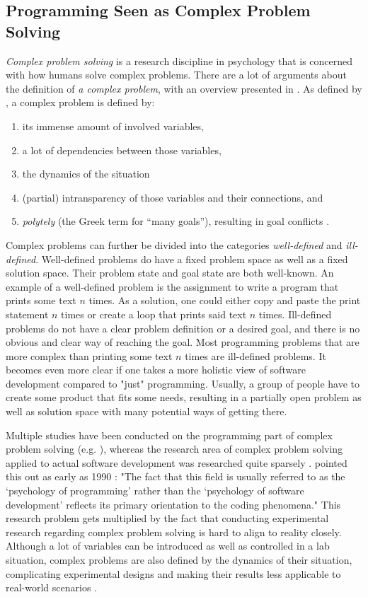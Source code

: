 \subsection{Programming Seen as Complex Problem Solving}
\emph{Complex problem solving} is a research discipline in psychology that is concerned with how humans solve complex problems.
There are a lot of arguments about the definition of \emph{a complex problem}, with an overview presented in \cite{dorner_complex_2017}.
As defined by \citeauthor{funke_complex_2012}, a complex problem is defined by:
%
\begin{enumerate}
\item its immense amount of involved variables,
\item a lot of dependencies between those variables,
\item the dynamics of the situation
\item (partial) intransparency of those variables and their connections, and
\item \emph{polytely} (the Greek term for “many goals”), resulting in goal conflicts \cite{funke_complex_2012}.
\end{enumerate}
%
Complex problems can further be divided into the categories \emph{well-defined} and \emph{ill-defined}.
Well-defined problems do have a fixed problem space as well as a fixed solution space.
Their problem state and goal state are both well-known.
An example of a well-defined problem is the assignment to write a program that prints some text $n$ times.
As a solution, one could either copy and paste the print statement $n$ times or create a loop that prints said text $n$ times.
Ill-defined problems do not have a clear problem definition or a desired goal, and there is no obvious and clear way of reaching the goal.
Most programming problems that are more complex than printing some text $n$ times are ill-defined problems.
It becomes even more clear if one takes a more holistic view of software development compared to "just" programming.
Usually, a group of people have to create some product that fits some needs, resulting in a partially open problem as well as solution space with many potential ways of getting there.

Multiple studies have been conducted on the programming part of complex problem solving (e.g. \cite{lawan_what_2019, gibson_software_2005, robertson_role_2008, taheri_evaluating_2015}), whereas the research area of complex problem solving applied to actual software development was researched quite sparsely \cite{wingo_using_2015}.
\citeauthor{curtis_psychology_1990} pointed this out as early as 1990 \cite{curtis_psychology_1990}: "The fact that this field is usually referred to as the `psychology of programming' rather than the `psychology of software development' reflects its primary orientation to the coding phenomena."
This research problem gets multiplied by the fact that conducting experimental research regarding complex problem solving is hard to align to reality closely.
Although a lot of variables can be introduced as well as controlled in a lab situation, complex problems are also defined by the dynamics of their situation, complicating experimental designs and making their results less applicable to real-world scenarios \cite{lawan_what_2019}.


